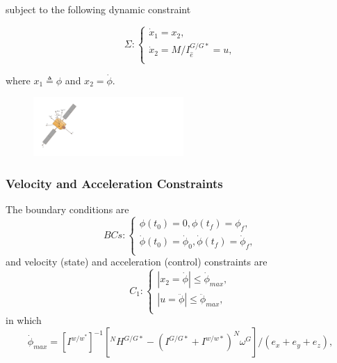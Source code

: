 \documentclass[letterpaper, preprint, paper,11pt]{AAS}	%
\begin{document}
	subject to the following dynamic constraint
	
	\begin{equation}\label{system}
	\Sigma:\left\{
	\begin{array}{l}
	\dot{x}_1=x_2, \\
	\dot{x}_2=M/I_{\hat{e}}^{G/G*}=u, \\
	\end{array}
	\right.
	\end{equation}
	
	where $x_1 \triangleq\phi$ and $x_2=\dot{\phi}$. 
	
	\begin{figure}[H]
		\begin{center}
			\includegraphics[width=2.25in]{./Figures/Spacecraft}  
		\end{center}    
	\end{figure}
	
	
	\subsubsection{Velocity and Acceleration Constraints}
	
	The boundary conditions are
	\begin{equation}\label{Bcs}
	BCs:\left\{
	\begin{array}{l}
	\phi(t_0)=0, \phi(t_f)=\phi_{f},\\
	\dot{\phi}(t_0)=\dot{\phi}_{0},\dot{ \phi}(t_f)=\dot{\phi}_{f}, \\
	\end{array}
	\right.
	\end{equation}
	and velocity (state) and acceleration (control) constraints are
	\begin{equation}\label{constraints1}
	C_1:\left\{
	\begin{array}{l}
	|x_2=\dot{\phi}|\leq \dot{\phi}_{max},\\
	|u=\ddot{\phi}|\leq \ddot{\phi}_{max},\\
	\end{array}
	\right.
	\end{equation}
	in which
	\begin{equation}
	\dot{\phi}_{max}=[I^{w/w^*}]^{-1}[^NH^{G/G*}-(I^{G/G*}+I^{w/w*})^N\omega^G]/(e_x+e_y+e_z),
	\end{equation}
	
\end{document}
